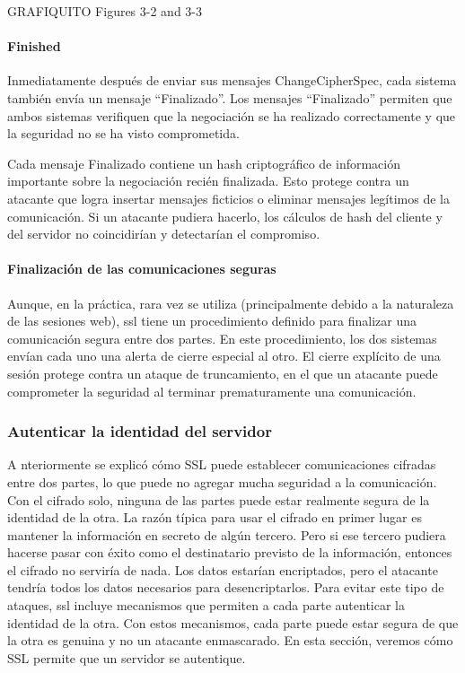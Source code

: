 GRAFIQUITO Figures 3-2 and 3-3

\paragraph*{Finished}
Inmediatamente después de enviar sus mensajes ChangeCipherSpec, cada 
sistema también envía un mensaje “Finalizado”. Los mensajes “Finalizado” 
permiten que ambos sistemas verifiquen que la negociación se ha realizado 
correctamente y que la seguridad no se ha visto comprometida.

Cada mensaje Finalizado contiene un hash criptográfico de información 
importante sobre la negociación recién finalizada. Esto protege contra 
un atacante que logra insertar mensajes ficticios o eliminar mensajes 
legítimos de la comunicación. Si un atacante pudiera hacerlo, los 
cálculos de hash del cliente y del servidor no coincidirían y detectarían 
el compromiso.

\paragraph*{Finalización de las comunicaciones seguras}

Aunque, en la práctica, rara vez se utiliza (principalmente debido a la 
naturaleza de las sesiones web), ssl tiene un procedimiento definido para 
finalizar una comunicación segura entre dos partes. En este procedimiento, 
los dos sistemas envían cada uno una alerta de cierre especial al otro. 
El cierre explícito de una sesión protege contra un ataque de truncamiento,
en el que un atacante puede comprometer la seguridad al terminar 
prematuramente una comunicación.

\subsubsection*{Autenticar la identidad del servidor}
A  nteriormente se explicó cómo SSL puede establecer comunicaciones 
cifradas entre dos partes, lo que puede no agregar mucha seguridad a 
la comunicación. Con el cifrado solo, ninguna de las partes puede 
estar realmente segura de la identidad de la otra. La razón típica 
para usar el cifrado en primer lugar es mantener la información en 
secreto de algún tercero. Pero si ese tercero pudiera hacerse pasar 
con éxito como el destinatario previsto de la información, entonces el 
cifrado no serviría de nada. Los datos estarían encriptados, pero el 
atacante tendría todos los datos necesarios para desencriptarlos. Para 
evitar este tipo de ataques, ssl incluye mecanismos que permiten a cada 
parte autenticar la identidad de la otra. Con estos mecanismos, cada 
parte puede estar segura de que la otra es genuina y no un atacante 
enmascarado. En esta sección, veremos cómo SSL permite que un servidor 
se autentique.

